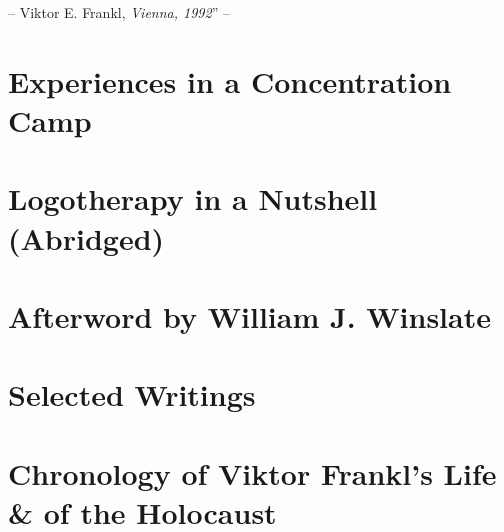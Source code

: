 \documentclass{article}
\numberwithin{equation}{section}
\begin{document}
-- Viktor E. Frankl, \textit{Vienna, 1992}'' -- \cite[pp. 10--11]{Frankl2017}


\section{Experiences in a Concentration Camp}


\section{Logotherapy in a Nutshell (Abridged)}


\section{Afterword by William J. Winslate}


\section{Selected Writings}


\section{Chronology of Viktor Frankl's Life \& of the Holocaust}


\printbibliography[heading=bibintoc]
	
\end{document}
